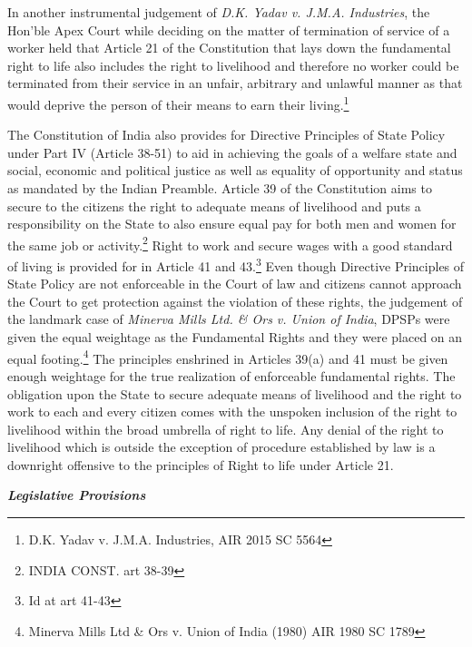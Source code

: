 \begin{multicols}{2}
\vspace{-.05cm}

\noi
In another instrumental judgement of \textit{D.K. Yadav v. J.M.A. Industries}, the Hon’ble Apex
Court while deciding on the matter of termination of service of a worker held that Article 21
of the Constitution that lays down the fundamental right to life also includes the right to
livelihood and therefore no worker could be terminated from their service in an unfair, arbitrary and unlawful manner as that would deprive the person of their means to earn their
living.\footnote{D.K. Yadav v. J.M.A. Industries, AIR 2015 SC 5564}

\vspace{-.05cm}

\noi
The Constitution of India also provides for Directive Principles of State Policy under Part IV
(Article 38-51) to aid in achieving the goals of a welfare state and social, economic and
political justice as well as equality of opportunity and status as mandated by the Indian
Preamble. Article 39 of the Constitution aims to secure to the citizens the right to adequate
means of livelihood and puts a responsibility on the State to also ensure equal pay for both
men and women for the same job or activity.\footnote{INDIA CONST. art 38-39} Right to work and secure wages with a good
standard of living is provided for in Article 41 and 43.\footnote{Id at art 41-43} Even though Directive Principles of
State Policy are not enforceable in the Court of law and citizens cannot approach the Court to
get protection against the violation of these rights, the judgement of the landmark case of
\textit{Minerva Mills Ltd. \& Ors v. Union of India}, DPSPs were given the equal weightage as the
Fundamental Rights and they were placed on an equal footing.\footnote{Minerva Mills Ltd \& Ors v. Union of India (1980) AIR 1980 SC 1789} The principles enshrined in
Articles 39(a) and 41 must be given enough weightage for the true realization of enforceable
fundamental rights. The obligation upon the State to secure adequate means of livelihood and
the right to work to each and every citizen comes with the unspoken inclusion of the right to
livelihood within the broad umbrella of right to life. Any denial of the right to livelihood
which is outside the exception of procedure established by law is a downright offensive to the
principles of Right to life under Article 21. 

\vspace{-.05cm}

\noi
{\large\it\bfseries Legislative Provisions}


\end{multicols}
